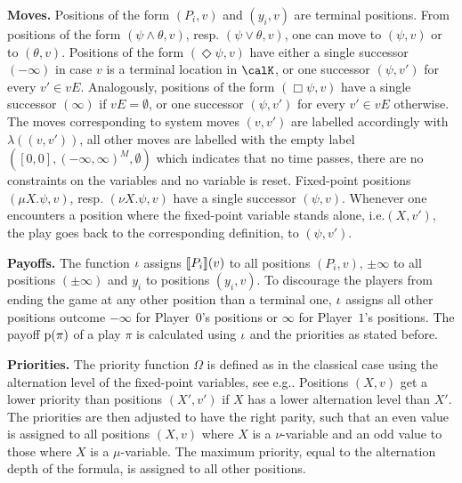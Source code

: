 \documentclass[fleqn,envcountsame]{LMCS}
\newcommand{\eg}{e.g.\xspace}
\newcommand{\ie}{i.e.\xspace}
\newcommand{\pzero}{Player~$0$\xspace}
\newcommand{\pone}{Player~$1$\xspace}
\newcommand{\Diam}{\ensuremath{\Diamond}}
\newcommand{\labels}{\ensuremath{\lambda}}
\begin{document}
\textbf{Moves.} 
Positions of the form $(P_i, v)$ and $(y_i, v)$
are terminal positions.
From positions of the form $(\psi \land \theta, v)$,
resp. $(\psi \lor \theta, v)$, one can move to 
$(\psi, v)$ or to  $(\theta, v)$.
Positions of the form $(\Diam \psi, v)$ have
either a single successor $(-\infty)$ in case $v$ is a terminal 
location in $\calK$, or one successor $(\psi, v')$ for every
$v' \in vE$. Analogously, positions of the form $(\Box \psi, v)$
have a single successor $(\infty)$ if $vE = \emptyset$,
or one successor $(\psi, v')$ for every $v' \in vE$ otherwise.
The moves corresponding to system moves $(v,v')$ are labelled
accordingly with $\labels((v,v'))$, all other 
moves are labelled with the empty label $([0,0],(-\infty, \infty)^M, \emptyset)$
which indicates that no time passes, there are no constraints on the variables
and no variable is reset.
Fixed-point positions $(\mu X. \psi, v)$, resp. $(\nu X. \psi, v)$
have a single successor $(\psi, v)$.
Whenever one encounters a position where the fixed-point variable stands alone,
\ie $(X, v')$, the play goes back to the corresponding definition,
to $(\psi, v')$.

\textbf{Payoffs.} 
The function $\iota$ assigns $\llbracket P_i\rrbracket(v)$
to all positions $(P_i, v)$, $\pm \infty$ to all
positions $(\pm \infty)$
and $y_i$ to positions $(y_i, v)$.
To discourage the players from ending the game at any other position
than a terminal one, $\iota$ assigns all other positions
outcome $-\infty$ for \pzero's positions or $\infty$
for \pone's positions.
The payoff $\mathrm{p}(\pi)$ of a play $\pi$ is calculated
using $\iota$ and the priorities as stated before.

\textbf{Priorities.} 
The priority function $\Omega$ is defined as in the classical case
using the alternation level of the fixed-point variables,
see \eg \cite{Graedel03}.
Positions $(X, v)$ get a lower priority
than positions $(X', v')$ if $X$ has a lower alternation level than $X'$.
The priorities are then adjusted to have the right parity, such that
an even value is assigned to all positions $(X, v)$ where $X$ is a 
$\nu$-variable and an odd value to those where $X$ is a $\mu$-variable.
The maximum priority, equal to the alternation depth of the formula,
is assigned to all other positions.
\end{document}
